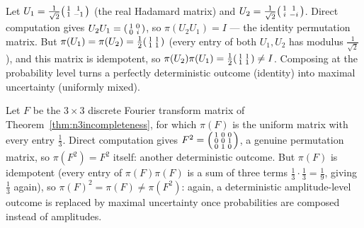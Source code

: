 \begin{example}
\label{ex:2x2-composition}
Let $U_1 = \tfrac1{\sqrt2}\begin{psmallmatrix}1&1\\1&-1\end{psmallmatrix}$
(the real Hadamard matrix) and $U_2 = \tfrac1{\sqrt2}
\begin{psmallmatrix}1&1\\i&-i\end{psmallmatrix}$. Direct computation gives
$U_2U_1 = \begin{psmallmatrix}1&0\\0&i\end{psmallmatrix}$, so
$\pi(U_2U_1) = I$ — the identity permutation matrix. But $\pi(U_1) =
\pi(U_2) = \tfrac12\begin{psmallmatrix}1&1\\1&1\end{psmallmatrix}$ (every
entry of both $U_1,U_2$ has modulus $\tfrac1{\sqrt2}$), and this matrix is
idempotent, so $\pi(U_2)\pi(U_1) = \tfrac12
\begin{psmallmatrix}1&1\\1&1\end{psmallmatrix} \neq I$. Composing at the
probability level turns a perfectly deterministic outcome (identity) into
maximal uncertainty (uniformly mixed).
\end{example}

\begin{example}
\label{ex:3x3-composition}
Let $F$ be the $3\times3$ discrete Fourier transform matrix of
Theorem~\ref{thm:n3incompleteness}, for which $\pi(F)$ is the uniform
matrix with every entry $\tfrac13$. Direct computation gives $F^2 =
\begin{psmallmatrix}1&0&0\\0&0&1\\0&1&0\end{psmallmatrix}$, a genuine
permutation matrix, so $\pi(F^2)=F^2$ itself: another deterministic
outcome. But $\pi(F)$ is idempotent (every entry of $\pi(F)\pi(F)$ is a
sum of three terms $\tfrac13\cdot\tfrac13=\tfrac19$, giving
$\tfrac13$ again), so $\pi(F)^2 = \pi(F) \neq \pi(F^2)$: again, a
deterministic amplitude-level outcome is replaced by maximal uncertainty
once probabilities are composed instead of amplitudes.
\end{example}

